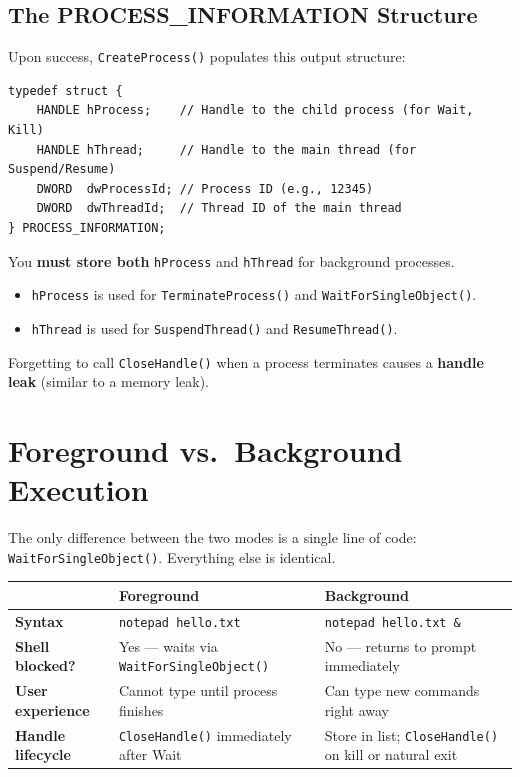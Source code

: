 \documentclass[12pt,a4paper]{article}
\begin{document}
\subsection{The PROCESS\_INFORMATION Structure}

Upon success, \texttt{CreateProcess()} populates this output structure:

\begin{lstlisting}
typedef struct {
    HANDLE hProcess;    // Handle to the child process (for Wait, Kill)
    HANDLE hThread;     // Handle to the main thread (for Suspend/Resume)
    DWORD  dwProcessId; // Process ID (e.g., 12345)
    DWORD  dwThreadId;  // Thread ID of the main thread
} PROCESS_INFORMATION;
\end{lstlisting}

\begin{warningbox}
    You \textbf{must store both} \texttt{hProcess} and \texttt{hThread} for background processes.
    \begin{itemize}[nosep]
        \item \texttt{hProcess} is used for \texttt{TerminateProcess()} and \texttt{WaitForSingleObject()}.
        \item \texttt{hThread} is used for \texttt{SuspendThread()} and \texttt{ResumeThread()}.
    \end{itemize}
    Forgetting to call \texttt{CloseHandle()} when a process terminates causes a \textbf{handle leak} (similar to a memory leak).
\end{warningbox}

\section{Foreground vs.\ Background Execution}

The only difference between the two modes is a single line of code: \texttt{WaitForSingleObject()}. Everything else is identical.

\begin{center}
\renewcommand{\arraystretch}{1.3}
\begin{tabularx}{\textwidth}{l X X}
    \toprule
     & \textbf{Foreground} & \textbf{Background} \\
    \midrule
    \textbf{Syntax} & \texttt{notepad hello.txt} & \texttt{notepad hello.txt \&} \\
    \textbf{Shell blocked?} & Yes --- waits via \texttt{WaitForSingleObject()} & No --- returns to prompt immediately \\
    \textbf{User experience} & Cannot type until process finishes & Can type new commands right away \\
    \textbf{Handle lifecycle} & \texttt{CloseHandle()} immediately after Wait & Store in list; \texttt{CloseHandle()} on kill or natural exit \\
    \bottomrule
\end{tabularx}
\end{center}
\end{document}
